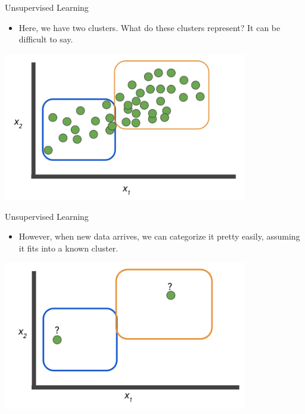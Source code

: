 \documentclass{beamer}
\begin{document}

\begin{frame}{Unsupervised Learning}

\begin{itemize}
\item Here, we have two clusters. What do these clusters represent? It can be difficult to say. 

\end{itemize}

\includegraphics[width=0.8\textwidth]{images/Graph6.png}

\end{frame}


\begin{frame}{Unsupervised Learning}

\begin{itemize}
\item However, when new data arrives, we can categorize it pretty easily, assuming it fits into a known cluster. 

\end{itemize}

\includegraphics[width=0.8\textwidth]{images/Graph7.png}

\end{frame}
\end{document}
